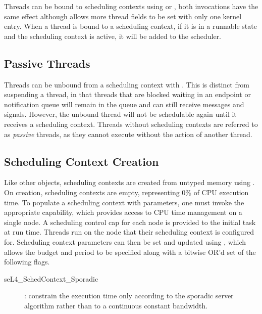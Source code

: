 Threads can be bound to scheduling contexts using  or
, both invocations have the same effect
although  allows more thread fields to be set with only
one kernel entry.  When a thread is bound to a scheduling context, if it is in a runnable state and
the scheduling context is active, it will be added to the scheduler.

\subsection{Passive Threads} \label{sec:passive}

Threads can be unbound from a scheduling context with
.  This is distinct from
suspending a thread, in that threads that are blocked waiting in an endpoint or notification queue
will remain in the queue and can still receive messages and signals.  However, the unbound thread
will not be schedul\-able again until it receives a scheduling context.  Threads without scheduling
contexts are referred to as \emph{passive} threads, as they cannot execute without the action of
another thread.

\subsection{Scheduling Context Creation} \label{sec:sc_creation}

Like other objects, scheduling contexts are created from untyped memory using
.  On creation, scheduling contexts are empty,
representing 0\% of CPU execution time.  To populate a scheduling context with parameters, one must
invoke the appropriate  capability, which provides access to CPU time management
on a single node.  A scheduling control cap for each node is provided to the initial task at run
time.  Threads run on the node that their scheduling context is configured for.  Scheduling context
parameters can then be set and updated using
, which allows the budget and period
to be specified along with a bitwise OR'd set of the following flags.

\begin{description}

\item[seL4\_SchedContext\_Sporadic]: constrain the execution time only according to the
sporadic server algorithm rather than to a continuous constant bandwidth.

\end{description}

